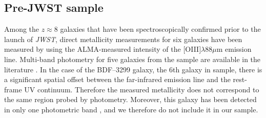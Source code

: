 \documentclass[twocolumn]{aastex631}
\newcommand{\jwst}{{\em JWST}}
\begin{document}
\subsection{Pre-JWST sample} 

Among the $z \approx 8$ galaxies that have been spectroscopically confirmed prior to the launch of \jwst, direct metallicity measurements for six galaxies have been measured by \cite{jones+2020} using the ALMA-measured intensity of the $[$O{\footnotesize\;III}$]\lambda88\mu$m emission line. Multi-band photometry for five galaxies from the \cite{jones+2020} sample are available in the literature \citep[see][for references]{jones+2020}. In the case of the BDF--3299 galaxy, the 6th galaxy in \cite{jones+2020} sample, there is a significant spatial offset between the far-infrared emission line and the rest-frame UV continuum. Therefore the measured metallicity does not correspond to the same region probed by photometry. Moreover, this galaxy has been detected in only one photometric band \citep{2011ApJ...730L..35V}, and we therefore do not include it in our sample. 
\end{document}
